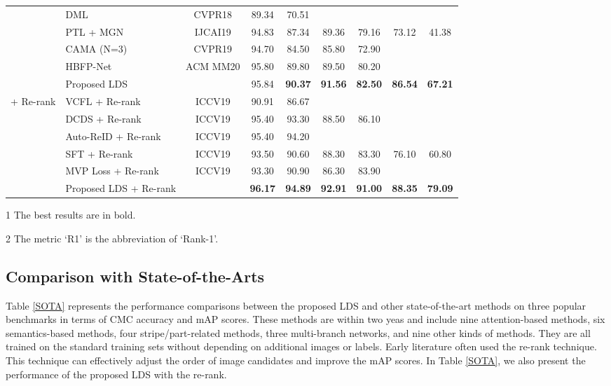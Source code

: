 \documentclass[a4paper]{cas-dc}
\begin{document}
\begin{table*}
\begin{threeparttable}
\begin{tabular}{llccccccc}
			& DML \cite{RN187}				   & CVPR18       & 89.34    & 70.51   &         &        &         &      \\
			& PTL + MGN \cite{RN491}           & IJCAI19      & 94.83    & 87.34   & 89.36   & 79.16  &  73.12  & 41.38 \\  & CAMA (N=3) \cite{RN514}          & CVPR19       & 94.70    & 84.50   & 85.80   & 72.90  &         &       \\  & HBFP-Net \cite{RN513}			 & ACM MM20       & 95.80    & 89.80   & 89.50   & 80.20  &         &       \\  & Proposed LDS           &                        & 95.84    & \textbf{90.37} & \textbf{91.56} & \textbf{82.50} & \textbf{86.54} & \textbf{67.21} \\  \hline \hline
			\multirow{6}{*}{+ Re-rank}
			& VCFL \cite{RN518} + Re-rank        & ICCV19       & 90.91    & 86.67  &        &        &         &       \\
			& DCDS \cite{RN450} + Re-rank        & ICCV19       & 95.40    & 93.30  & 88.50  & 86.10  &         &       \\
			& Auto-ReID \cite{RN448} + Re-rank   & ICCV19       & 95.40    & 94.20  &        &        &         &       \\
			& SFT \cite{RN457} + Re-rank         & ICCV19       & 93.50    & 90.60  & 88.30  & 83.30  &  76.10  & 60.80 \\
			& MVP Loss \cite{RN521} + Re-rank    & ICCV19       & 93.30    & 90.90  & 86.30  & 83.90  &         &       \\ 
			& Proposed LDS + Re-rank             &  & \textbf{96.17} & \textbf{94.89} & \textbf{92.91} & \textbf{91.00} & \textbf{88.35} & \textbf{79.09}\\ \hline
		\end{tabular}
		\begin{tablenotes}
			\item[1] The best results are in bold. 
			\item[2] The metric `R1' is the abbreviation of `Rank-1'.
		\end{tablenotes}
	\end{threeparttable}
\end{table*}

\subsection{Comparison with State-of-the-Arts}
Table \ref{SOTA} represents the performance comparisons between the proposed LDS and other state-of-the-art methods on three popular benchmarks in terms of CMC accuracy and mAP scores. These methods are within two yeas and include nine attention-based methods, six semantics-based methods, four stripe/part-related methods, three multi-branch networks, and nine other kinds of methods. They are all trained on the standard training sets without depending on additional images or labels. Early literature often used the re-rank \cite{RN523} technique. This technique can effectively adjust the order of image candidates and improve the mAP scores. In Table \ref{SOTA}, we also present the performance of the proposed LDS with the re-rank.
\end{document}
